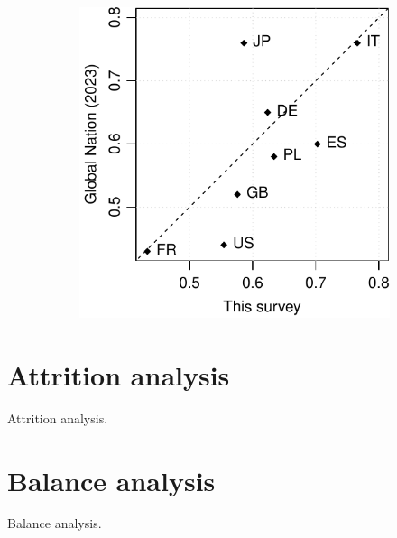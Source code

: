 \begin{figure}[h!]
\begin{subfigure}{.45\textwidth}
  \includegraphics[width=\textwidth]{../figures/all/my_tax_global_nation_comparison.pdf}%
\end{subfigure}
\end{figure}

\clearpage
\section{Attrition analysis}\label{app:attrition}

\begin{table}[h!]\label{tab:attrition}
    \caption[Attrition analysis]{Attrition analysis.} 
    \makebox[\textwidth][c]{\resizebox*{!}{.87\textheight}{ %
        }}
\end{table}

\clearpage
\section{Balance analysis}\label{app:balance}

\begin{table}[h]\label{tab:balance}
    \caption[Balance analysis]{Balance analysis.} 
    \makebox[\textwidth][c]{
\resizebox*{!}{.71\textheight}{ 
        
        }
    }
\end{table}
\clearpage

